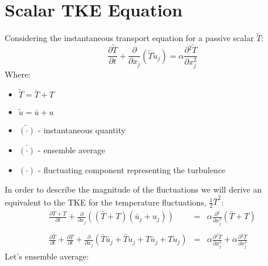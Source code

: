 \documentclass[11pt, a4paper]{article}
\newcommand{\parder}[2]{\frac{\partial {#1}}{\partial {#2}}}
\begin{document}
\section{Scalar TKE Equation}
Considering the instantaneous transport equation for a passive scalar $\tilde{T}$:
\begin{equation}
    \parder{\tilde{T}}{t}+\parder{}{x_j}\left(\tilde{T}\tilde{u}_j\right)=\alpha\parder{^2\tilde{T}}{x^2_j}
\end{equation}
Where:
\begin{itemize}
    \item $\tilde{T}=\bar{T}+T$
    \item $\tilde{u}=\bar{u}+u$
    \item $\tilde{\left(\cdot\right)}$ - instantaneous
quantity
    \item $\bar{\left(\cdot\right)}$ - ensemble average
    \item $\left(\cdot\right)$ - fluctuating component representing the
turbulence
\end{itemize}
In order to describe the magnitude of the fluctuations we will derive an equivalent to the TKE for the temperature fluctuations, $\frac{1}{2}\bar{T}^2$:
\begin{equation}
    \begin{array}{rcl}
        \displaystyle \parder{\bar{T}+T}{t}+\parder{}{x_j}\left(\left(\bar{T}+T\right)\left(\bar{u}_j+u_j\right)\right) & = & \displaystyle \alpha\parder{^2}{x^2_j}\left(\bar{T}+T\right) \\\\
        \displaystyle \parder{\bar{T}}{t}+\parder{T}{t}+\parder{}{x_j}\left(\bar{T}\bar{u}_j+\bar{T}u_j+T\bar{u}_j+Tu_j\right) & = & \displaystyle \alpha\parder{^2\bar{T}}{x^2_j}+\alpha\parder{^2T}{x^2_j}
        \label{eq: given equation}
    \end{array}
\end{equation}
Let's ensemble average: %
\end{document}
